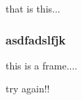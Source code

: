 \documentclass[slides, showmeta, mh]{mikoslides}
\begin{document}
\begin{note}
    that is this...
\end{note}

\begin{frame}
  \frametitle{asdfadslfjk}
      this is a frame....
\end{frame}

\begin{module}
  \begin{frame}
    try again!!
   \end{frame}
\end{module}
\end{document}
